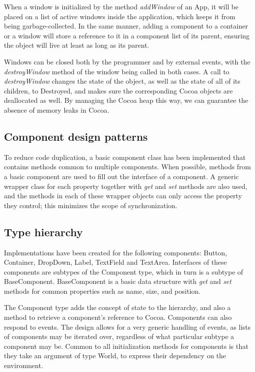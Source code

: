 \documentclass[a4paper]{article}
\begin{document}
When a window is initialized by the method \textit{addWindow} of an App, it will be placed on a list of active windows inside the application, which keeps it from being garbage-collected. In the same manner, adding a component to a container or a window will store a reference to it in a component list of its parent, ensuring the object will live at least as long as its parent.

Windows can be closed both by the programmer and by external events, with the \textit{destroyWindow} method of the window being called in both cases. A call to \textit{destroyWindow} changes the state of the object, as well as the state of all of its children, to Destroyed, and makes sure the corresponding Cocoa objects are deallocated as well. By managing the Cocoa heap this way, we can guarantee the absence of memory leaks in Cocoa.

\subsection{Component design patterns}
To reduce code duplication, a basic component class has been implemented that contains methods common to multiple components. When possible, methods from a basic component are used to fill out the interface of a component. A generic wrapper class for each property together with \textit{get} and \textit{set} methods are also used, and the methods in each of these wrapper objects can only access the property they control; this minimizes the scope of synchronization.

\subsection{Type hierarchy}
Implementations have been created for the following components: Button, Container, DropDown, Label, TextField and TextArea. Interfaces of these components are subtypes of the Component type, which in turn is a subtype of BaseComponent. BaseComponent is a basic data structure with \textit{get} and \textit{set} methods for common properties such as name, size, and position. 

The Component type adds the concept of state to the hierarchy, and also a method to retrieve a component's reference to Cocoa. Components can also respond to events. The design allows for a very generic handling of events, as lists of components may be iterated over, regardless of what particular subtype a component may be. Common to all initialization methods for components is that they take an argument of type World, to express their dependency on the environment.
\end{document}
